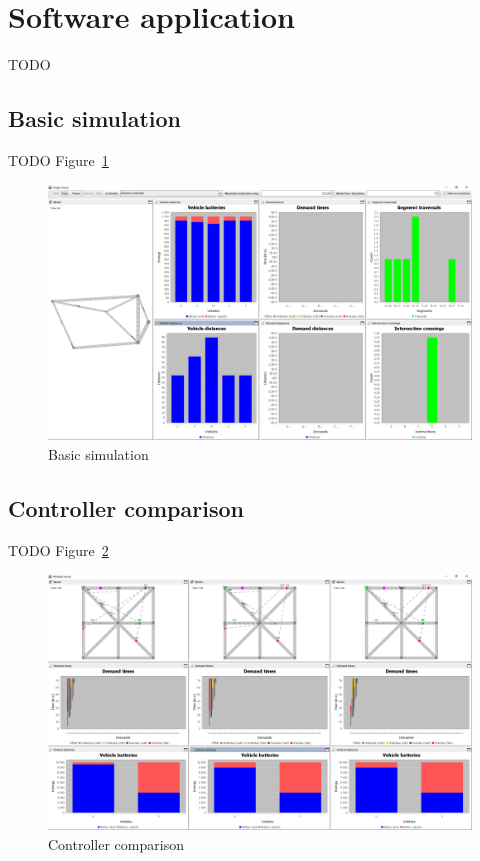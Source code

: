 \documentclass{article}
\begin{document}
    \section{Software application}
    \label{sec:app}
    TODO

    \subsection{Basic simulation}
    \label{sec:basic}
    TODO Figure~\ref{fig:4}

    \begin{figure}[htbp]
        \centering
        \includegraphics[width=\textwidth]{../../screenshots/basic-simulation.png}
        \caption{Basic simulation}
        \label{fig:4}
    \end{figure}

    \subsection{Controller comparison}
    \label{sec:controller-comparison}
    TODO Figure~\ref{fig:5}

    \begin{figure}[htbp]
        \centering
        \includegraphics[width=\textwidth]{../../screenshots/controller-comparison.png}
        \caption{Controller comparison}
        \label{fig:5}
    \end{figure}
\end{document}
